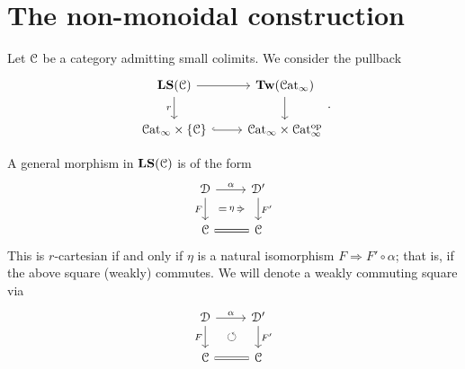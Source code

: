 \documentclass[main.tex]{subfiles}
\begin{document}
\section{The non-monoidal construction}
\label{sec:the_non_monoidal_construction}

Let $\mathcal{C}$ be a category admitting small colimits. We consider the pullback
\begin{equation*}
  \begin{tikzcd}
    \LS(\category{C})
    \arrow[r]
    \arrow[d, swap, "r"]
    & \Tw(\ICat)
    \arrow[d]
    \\
    \ICat \times \{\category{C}\}
    \arrow[r, hook]
    & \ICat \times \ICat\op
  \end{tikzcd}.
\end{equation*}

A general morphism in $\mathbf{LS}(\mathcal{C})$ is of the form
\begin{equation*}
  \begin{tikzcd}
    \category{D}
    \arrow[r, "\alpha"]
    \arrow[d, ""{name=L, right}, "F"{left}]
    & \category{D}'
    \arrow[d, ""{name=R, left}, "F'"{right}]
    \\
    \category{C}
    & \category{C}
    \arrow[l, equals]
    \arrow[Rightarrow, from=L, to=R, shorten=1.5ex, "\eta"{description}]
  \end{tikzcd}
\end{equation*}
This is $r$-cartesian if and only if $\eta$ is a natural isomorphism $F \Rightarrow F' \circ \alpha$; that is, if the above square (weakly) commutes. We will denote a weakly commuting square via
\begin{equation*}
  \begin{tikzcd}
    \category{D}
    \arrow[r, "\alpha"]
    \arrow[d, ""{name=L, right}, "F"{left}]
    & \category{D}'
    \arrow[d, ""{name=R, left}, "F'"{right}]
    \\
    \category{C}
    & \category{C}
    \arrow[l, equals]
    \arrow[Rightarrow, from=L, to=R, shorten=1.5ex, phantom, "\circlearrowleft"]
  \end{tikzcd}
\end{equation*}
\end{document}
